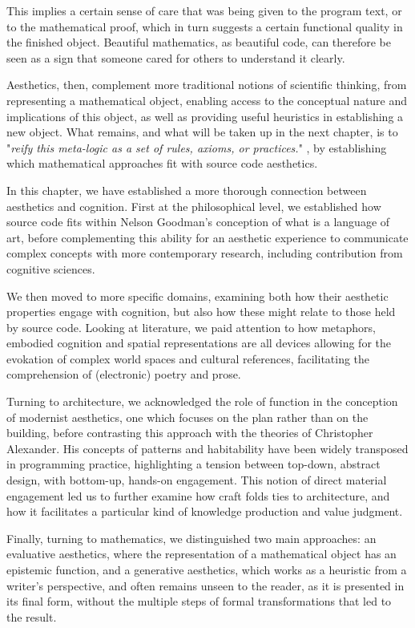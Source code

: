 This implies a certain sense of care that was being given to the program text, or to the mathematical proof, which in turn suggests a certain functional quality in the finished object. Beautiful mathematics, as beautiful code, can therefore be seen as a sign that someone cared for others to understand it clearly.

Aesthetics, then, complement more traditional notions of scientific thinking, from representing a mathematical object, enabling access to the conceptual nature and implications of this object, as well as providing useful heuristics in establishing a new object. What remains, and what will be taken up in the next chapter, is to "\emph{reify this meta-logic as a set of rules, axioms, or practices.}" \citep{root-bernstein_aesthetic_2002}, by establishing which mathematical approaches fit with source code aesthetics.

\spacer

In this chapter, we have established a more thorough connection between aesthetics and cognition. First at the philosophical level, we established how source code fits within Nelson Goodman's conception of what is a language of art, before complementing this ability for an aesthetic experience to communicate complex concepts with more contemporary research, including contribution from cognitive sciences.

We then moved to more specific domains, examining both how their aesthetic properties engage with cognition, but also how these might relate to those held by source code. Looking at literature, we paid attention to how metaphors, embodied cognition and spatial representations are all devices allowing for the evokation of complex world spaces and cultural references, facilitating the comprehension of (electronic) poetry and prose.

Turning to architecture, we acknowledged the role of function in the conception of modernist aesthetics, one which focuses on the plan rather than on the building, before contrasting this approach with the theories of Christopher Alexander. His concepts of patterns and habitability have been widely transposed in programming practice, highlighting a tension between top-down, abstract design, with bottom-up, hands-on engagement. This notion of direct material engagement led us to further examine how craft folds ties to architecture, and how it facilitates a particular kind of knowledge production and value judgment.

Finally, turning to mathematics, we distinguished two main approaches: an evaluative aesthetics, where the representation of a mathematical object has an epistemic function, and a generative aesthetics, which works as a heuristic from a writer's perspective, and often remains unseen to the reader, as it is presented in its final form, without the multiple steps of formal transformations that led to the result.

